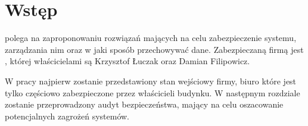 \newpage\section*{Wstęp}
\TytulPolski \space polega na zaproponowaniu rozwiązań mających na celu zabezpieczenie systemu, zarządzania nim oraz w jaki sposób przechowywać dane. Zabezpieczaną firmą jest \NazwaFirmy, której właścicielami są Krzysztof Łuczak oraz Damian Filipowicz. 

W pracy najpierw zostanie przedstawiony stan wejściowy firmy, biuro które jest tylko częściowo zabezpieczone przez właścicieli budynku. \linebreak W następnym rozdziale zostanie przeprowadzony audyt bezpieczeństwa, \linebreak mający na celu oszacowanie potencjalnych zagrożeń systemów.